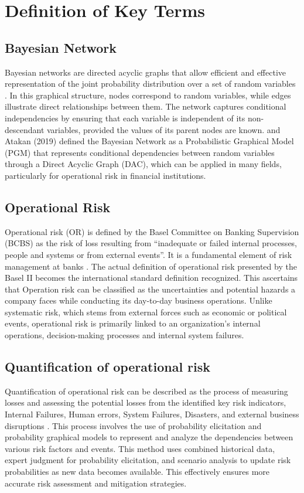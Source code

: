\section{Definition of Key Terms}
\subsection{Bayesian Network}
Bayesian networks are directed acyclic graphs that allow efficient and effective representation of the joint probability distribution over a set of random variables \parencite{sanford_operational_2015}. In this graphical structure, nodes correspond to random variables, while edges illustrate direct relationships between them. The network captures conditional independencies by ensuring that each variable is independent of its non-descendant variables, provided the values of its parent nodes are known. \textcite{unknown} and Atakan (2019) defined the Bayesian Network as a Probabilistic Graphical Model (PGM) that represents conditional dependencies between random variables through a Direct Acyclic Graph (DAC), which can be applied in many fields, particularly for operational risk in financial institutions. 
\subsection{Operational Risk}
Operational risk (OR) is defined by the Basel Committee on Banking Supervision (BCBS) as the risk of loss resulting from “inadequate or failed internal processes, people and systems or from external events”. It is a fundamental element of risk management at banks \parencite{bcbs2004basel2}. The actual definition of operational risk presented by the Basel II becomes the international standard definition recognized. This ascertains that Operation risk can be classified as the uncertainties and potential hazards a company faces while conducting its day-to-day business operations. Unlike systematic risk, which stems from external forces such as economic or political events, operational risk is primarily linked to an organization's internal operations, decision-making processes and internal system failures.
\subsection{Quantification of operational risk }
Quantification of operational risk can be described as the process of measuring losses and assessing the potential losses from the identified key risk indicators, Internal Failures, Human errors, System Failures, Disasters, and external business disruptions \parencite{kim2021system}. This process involves the use of probability elicitation and probability graphical models to represent and analyze the dependencies between various risk factors and events. This method uses combined historical data, expert judgment for probability elicitation, and scenario analysis to update risk probabilities as new data becomes available. This effectively ensures more accurate risk assessment and mitigation strategies.
